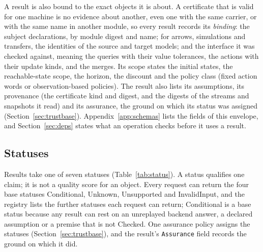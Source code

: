 \documentclass[11pt]{article}
\newcommand{\code}[1]{\texttt{#1}}
\theoremstyle{definition}
\theoremstyle{plain}
\begin{document}
A result is also bound to the exact objects it is about. A certificate that is valid for one
machine is no evidence about another, even one with the same carrier, or with the same name in
another module, so every result records its \emph{binding}: the subject declarations, by module
digest and name; for arrows, simulations and transfers, the identities of the source and target
models; and the interface it was checked against, meaning the queries with their value
tolerances, the actions with their update kinds, and the merges. Its scope states the initial
states, the reachable-state scope, the horizon, the discount and the policy class (fixed action
words or observation-based policies). The result also lists its assumptions, its provenance (the
certificate kind and digest, and the digests of the streams and snapshots it read) and its
assurance, the ground on which its status was assigned (Section~\ref{sec:trustbase}).
Appendix~\ref{app:schemas} lists the fields of this envelope, and Section~\ref{sec:deps} states what
an operation checks before it uses a result.

\subsection{Statuses}

Results take one of seven statuses (Table~\ref{tab:status}). A status qualifies one claim; it
is not a quality score for an object. Every request can return the four base statuses
Conditional, Unknown, Unsupported and InvalidInput, and the registry lists the further statuses
each request can return; Conditional is a base status because any result can rest on an
unreplayed backend answer, a declared assumption or a premise that is not Checked. One assurance policy assigns the statuses (Section~\ref{sec:trustbase}), and the
result's \code{Assurance} field records the ground on which it did.
\end{document}
